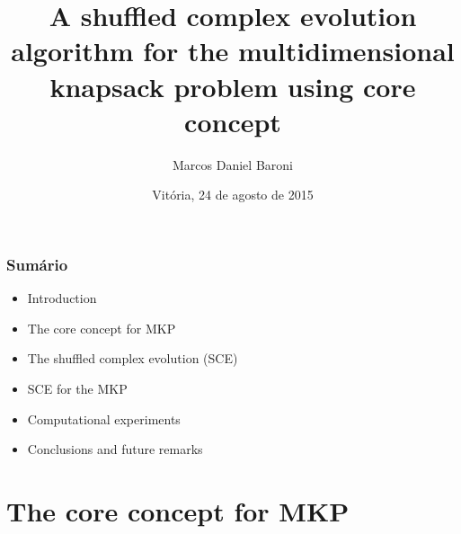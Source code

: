 \documentclass[10pt,fleqn]{beamer}
\title[]{A shuffled complex evolution algorithm for
the multidimensional knapsack problem using core concept}
\subtitle{}
\author{Marcos Daniel Baroni}
\institute[NINFA]{}
\date[Vitória, 24/08/2015]{Vitória, 24 de agosto de 2015}
\newcommand{\litem}[1]{
  \item{#1 \vspace{9pt}}
}
\begin{document}





\begin{frame}
  \titlepage
\end{frame}

\begin{frame}
  \frametitle{Sumário}
  \begin{itemize}
    \litem{Introduction}
	\litem{The core concept for MKP}
	\litem{The shuffled complex evolution (SCE)}
	\litem{SCE for the MKP}
	\litem{Computational experiments}
	\litem{Conclusions and future remarks}
  \end{itemize}
\end{frame}

\section{The core concept for MKP}
\end{document}
